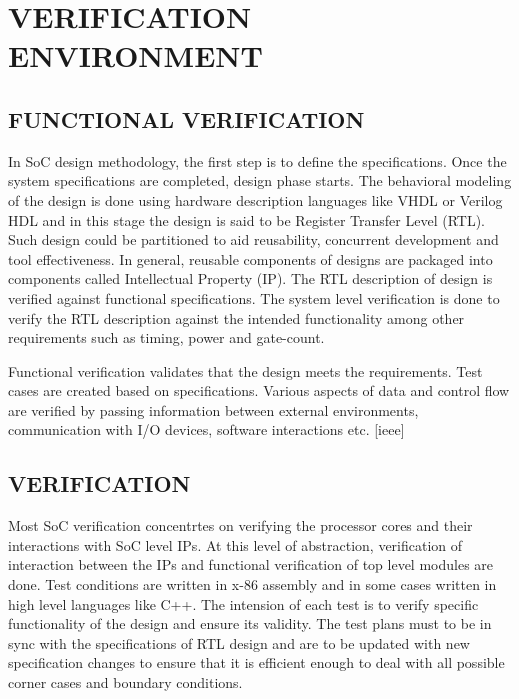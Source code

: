 \chapter{VERIFICATION ENVIRONMENT}
\label{chap:verification.tex}

\section {FUNCTIONAL VERIFICATION}

In SoC design methodology, the first step is to define the specifications. Once the system specifications are completed, design phase starts. The behavioral modeling of the design is done using hardware description languages like VHDL or Verilog HDL and in this stage the design is said to be Register Transfer Level (RTL). Such design could be partitioned to aid reusability, concurrent development and tool effectiveness. In general, reusable components of designs are packaged into components called Intellectual Property (IP). The RTL description of design is verified against functional specifications.  The system level verification is done to verify the RTL description against the intended functionality among other requirements such as timing, power and gate-count. 



Functional verification validates that the design meets the requirements. Test cases are created based on specifications. Various aspects of data and control flow are verified by passing information between external environments, communication with I/O devices,  software interactions etc. [ieee]

 
\section {VERIFICATION}

Most SoC verification concentrtes on verifying the processor cores and their interactions with SoC level IPs. At this level of abstraction, verification of interaction between the IPs and functional verification of top level modules are done.  Test conditions are written in x-86 assembly and in some cases written in high level languages like C++. The intension of each test is to verify specific functionality of the design and ensure its validity. The test plans must to be in sync with the specifications of RTL design and are to be updated with new specification changes to ensure that it is efficient enough to deal with all possible corner cases and boundary conditions.

